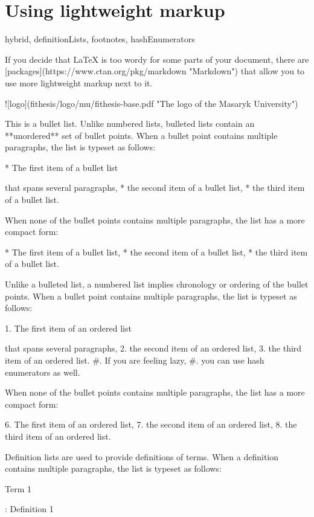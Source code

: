 \documentclass[
  digital, %
  table,   %
  nolof,     %
  nolot,     %
]{fithesis3}
\begin{document}
\chapter{Using lightweight markup}
\begin{markdown*}{%
  hybrid,
  definitionLists,
  footnotes,
  hashEnumerators}

If you decide that \LaTeX{} is too wordy for some parts of your
document, there are [packages](https://www.ctan.org/pkg/markdown
"Markdown") that allow you to use more lightweight markup next
to it.

 ![logo](fithesis/logo/mu/fithesis-base.pdf "The logo of the
  Masaryk University")

This is a bullet list. Unlike numbered lists, bulleted lists
contain an **unordered** set of bullet points. When a bullet point
contains multiple paragraphs, the list is typeset as follows:

  * The first item of a bullet list

    that spans several paragraphs,
  * the second item of a bullet list,
  * the third item of a bullet list.

When none of the bullet points contains multiple paragraphs, the
list has a more compact form:

  * The first item of a bullet list,
  * the second item of a bullet list,
  * the third item of a bullet list.

Unlike a bulleted list, a numbered list implies chronology or
ordering of the bullet points. When a bullet point
contains multiple paragraphs, the list is typeset as follows:

  1. The first item of an ordered list

     that spans several paragraphs,
  2. the second item of an ordered list,
  3. the third item of an ordered list.
  #. If you are feeling lazy,
  #. you can use hash enumerators as well.

When none of the bullet points contains multiple paragraphs, the
list has a more compact form:

  6. The first item of an ordered list,
  7. the second item of an ordered list,
  8. the third item of an ordered list.

Definition lists are used to provide definitions of terms. When
a definition contains multiple paragraphs, the list is typeset
as follows:

Term 1

:   Definition 1


\end{markdown*}
\end{document}
